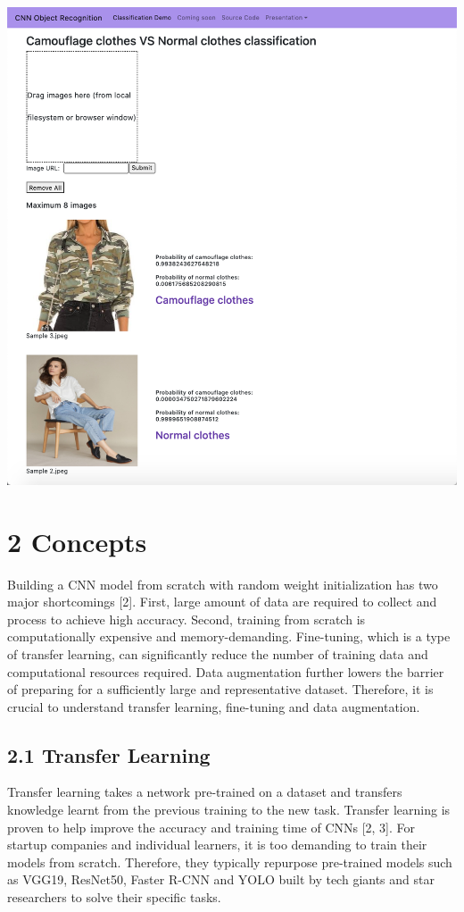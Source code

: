 \documentclass[11pt]{article}
\begin{document}
\begin{center}
	\includegraphics[width=0.5\columnwidth]{screenshot.png} %
\end{center}

\section*{\large{2 \hspace{10pt} Concepts}}
Building a CNN model from scratch with random weight initialization has two major shortcomings [2]. First, large amount of data are required to collect and process to achieve high accuracy. Second, training from scratch is computationally expensive and memory-demanding. Fine-tuning, which is a type of transfer learning, can significantly reduce the number of training data and computational resources required. Data augmentation further lowers the barrier of preparing for a sufficiently large and representative dataset. Therefore, it is crucial to understand transfer learning, fine-tuning and data augmentation.

\subsection*{2.1 \hspace{10pt} Transfer Learning}
Transfer learning takes a network pre-trained on a dataset and transfers knowledge learnt from the previous training to the new task. Transfer learning is proven to help improve the accuracy and training time of CNNs [2, 3].
For startup companies and individual learners, it is too demanding to train their models from scratch. Therefore, they typically repurpose pre-trained models such as VGG19, ResNet50, Faster R-CNN and YOLO built by tech giants and star researchers to solve their specific tasks.
\end{document}
